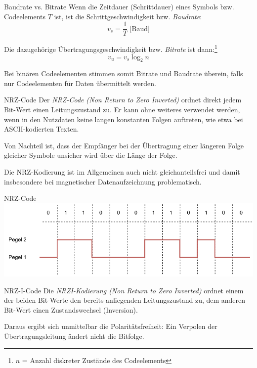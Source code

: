 \begin{bonus}{Baudrate vs. Bitrate}
    Wenn die Zeitdauer (Schrittdauer) eines Symbols bzw. Codeelements $T$ ist, ist die Schrittgeschwindigkeit bzw. \emph{Baudrate}:
    \[
        v_s = \frac{1}{T} \text{ [Baud]}
    \]

    Die dazugehörige Übertragungsgeschwindigkeit bzw. \emph{Bitrate} ist dann:\footnote{$n$ = Anzahl diskreter Zustände des Codeelements}
    \[
        v_u = v_s \log_2 n
    \]

    Bei binären Codeelementen stimmen somit Bitrate und Baudrate überein, falls nur Codeelementen für Daten übermittelt werden.
\end{bonus}

\begin{defi}{NRZ-Code}
    Der \emph{NRZ-Code (Non Return to Zero Inverted)} ordnet direkt jedem Bit-Wert einen Leitungszustand zu.
    Er kann ohne weiteres verwendet werden, wenn in den Nutzdaten keine langen konstanten Folgen auftreten, wie etwa bei ASCII-kodierten Texten.

    Von Nachteil ist, dass der Empfänger bei der Übertragung einer längeren Folge gleicher Symbole unsicher wird über die Länge der Folge.

    Die NRZ-Kodierung ist im Allgemeinen auch nicht gleichanteilsfrei und damit insbesondere bei magnetischer Datenaufzeichnung problematisch.
\end{defi}

\begin{example}{NRZ-Code}
    \centering
    \includegraphics[width=.9\textwidth]{includes/figures/example_nrz.pdf}
\end{example}

\begin{defi}{NRZ-I-Code}
    Die \emph{NRZI-Kodierung (Non Return to Zero Inverted)} ordnet einem der beiden Bit-Werte den bereits anliegenden Leitungszustand zu, dem anderen Bit-Wert einen Zustandswechsel (Inversion).

    Daraus ergibt sich unmittelbar die Polaritätsfreiheit: Ein Verpolen der Übertragungsleitung ändert nicht die Bitfolge.
\end{defi}

